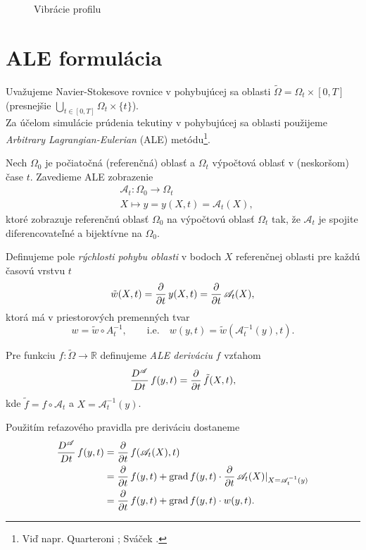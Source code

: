 \begin{figure}[t]
  \begin{center}
    \caption{Vibrácie profilu}
    \label{si-im-vibrations}
  \end{center}
\end{figure}


\section{ALE formulácia}

Uvažujeme Navier-Stokesove rovnice v pohybujúcej sa oblasti 
$\widetilde\Omega=\Omega_t\times[0,T]$ (presnejšie 
$\bigcup_{t\in[0,T]}\Omega_t\times\{t\}$). \\
Za účelom simulácie prúdenia tekutiny v pohybujúcej sa oblasti použijeme 
{\it Arbitrary Lagrangian-Eulerian} (ALE) metódu\footnote{Viď napr. Quarteroni 
\cite[s. 37]{quarteroni}; Sváček \cite[s. 6]{svacek}.}. 

Nech $\Omega_0$ je počiatočná (referenčná) oblasť a $\Omega_t$ výpočtová oblasť v
(neskoršom) čase $t$. Zavedieme ALE zobrazenie \[
\begin{split}
&\mathcal A_t:\Omega_0\rightarrow\Omega_t\\
&X\mapsto y=y(X,t)=\mathcal A_t(X),
\end{split}
\]
ktoré zobrazuje referenčnú oblasť $\Omega_0$ na výpočtovú oblasť $\Omega_t$ tak,
že $\mathcal A_t$ je spojite diferencovateľné a bijektívne na $\Omega_0$. 

Definujeme pole {\it rýchlosti pohybu oblasti} v bodoch $X$ referenčnej oblasti pre
každú časovú vrstvu $t$ $$\tilde w(X,t)=\frac{\partial}{\partial t}\, y(X,t)=\frac{\partial}{\partial t}\, \mathcal A_t(X),$$
ktorá má v priestorových premenných tvar
$$w=\tilde w\circ A_t^{-1}, \qquad \mbox{i.e.} \quad w(y,t)=\tilde w(\mathcal A_t^{-1}(y),t).$$

Pre funkciu $f:\widetilde\Omega\rightarrow\mathbb R$ definujeme {\it ALE
deriváciu} $f$ vzťahom $$\frac{D^\mathcal A}{Dt}\, f(y,t) = \frac{\partial}{\partial t}\, \tilde f(X,t),$$
kde $\tilde f=f\circ\mathcal A_t$ a $X=\mathcal A_t^{-1}(y)$.

Použitím reťazového pravidla pre deriváciu dostaneme
\[
\begin{split}
\frac{D^\mathcal A}{Dt}\, f(y,t) &= \frac{\partial}{\partial t}\, f(\mathcal A_t(X),t) \\
&= \frac{\partial}{\partial t}\, f(y,t) + \mbox{grad}\,f(y,t) \cdot \frac{\partial}{\partial t}\, \mathcal A_t(X)|_{X=\mathcal A_t^{-1}(y)} \\
&= \frac{\partial}{\partial t}\, f(y,t) + \mbox{grad}\,f(y,t) \cdot w(y,t).
\end{split}
\]

